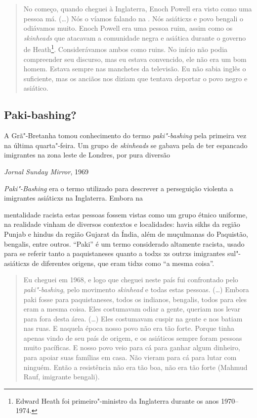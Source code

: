 \begin{quote}
No começo, quando cheguei à Inglaterra, Enoch Powell era visto como uma pessoa má. (\ldots{}) Nós o víamos falando na . Nós asiáticxs e povo bengali o odiávamos muito. Enoch Powell era uma pessoa ruim, assim como os \emph{skinheads} que atacavam a comunidade negra e asiática durante o governo de Heath\footnote{Edward Heath foi primeiro"-ministro da Inglaterra durante os anos 1970--1974.}. Considerávamos ambos como ruins. No início não podia compreender seu discurso, mas eu estava convencido, ele não era um bom homem. Estava sempre nas manchetes da televisão. Eu não sabia inglês o suficiente, mas os anciãos nos diziam que tentava deportar o povo negro e asiático.
\end{quote}



\subsection{Paki-bashing?}

\epigraph{A Grã"-Bretanha tomou conhecimento do termo \emph{paki"-bashing} pela primeira vez na última quarta"-feira. Um grupo de \emph{skinheads} se gabava pela  de ter espancado imigrantes na zona leste de Londres, por pura diversão}{\textit{Jornal Sunday Mirror}, 1969}

\emph{Paki"-Bashing} era o termo utilizado para descrever a perseguição violenta a imigrantes 
asiáticxs na Inglaterra. Embora na \linebreak

\noindent{}mentalidade racista estas pessoas fossem vistas como um grupo étnico uniforme, na realidade vinham de diversos contextos e localidades: havia sikhs
da região Punjab e hindus da região Gujarat da Índia, além de muçulmanas do Paquistão, bengalis, entre outros. ``Paki'' é um termo considerado altamente racista, usado para se referir tanto a paquistaneses quanto a todxs xs outrxs imigrantes sul"-asiáticxs de diferentes origens, que eram tidxs como ``a mesma coisa''.

\begin{quote}
Eu cheguei em 1968, e logo que cheguei neste país fui confrontado pelo \emph{paki"-bashing}, pelo movimento \emph{skinhead} e todas estas pessoas. (\ldots{}) Embora paki fosse para paquistaneses, todos os indianos, bengalis, todos para eles eram a mesma coisa. Eles costumavam odiar a gente, queriam nos levar para fora desta área. (\ldots{}) Eles costumavam cuspir na gente e nos batiam nas ruas. E naquela época nosso povo não era tão forte. Porque tinha apenas vindo de seu país de origem, e os asiáticos sempre foram pessoas muito pacíficas. E nosso povo veio para cá para ganhar algum dinheiro, para apoiar suas famílias em casa. Não vieram para cá para lutar com ninguém. Então a resistência não era tão boa, não era tão forte (Mahmud Rauf, imigrante bengali).
\end{quote}

